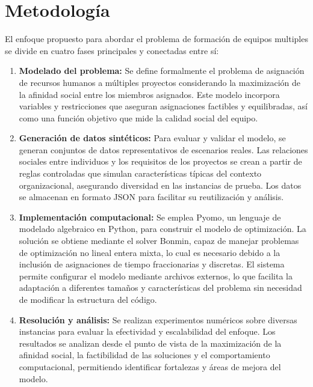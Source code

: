 \documentclass[conference]{IEEEtran}
\begin{document}
\section{Metodología}

El enfoque propuesto para abordar el problema de formación de equipos multiples se divide en cuatro fases principales y conectadas entre sí:

\begin{enumerate}
    \item \textbf{Modelado del problema:} Se define formalmente el problema de asignación de recursos humanos a múltiples proyectos considerando la maximización de la afinidad social entre los miembros asignados. Este modelo incorpora variables y restricciones que aseguran asignaciones factibles y equilibradas, así como una función objetivo que mide la calidad social del equipo.

    \item \textbf{Generación de datos sintéticos:} Para evaluar y validar el modelo, se generan conjuntos de datos representativos de escenarios reales. Las relaciones sociales entre individuos y los requisitos de los proyectos se crean a partir de reglas controladas que simulan características típicas del contexto organizacional, asegurando diversidad en las instancias de prueba. Los datos se almacenan en formato JSON para facilitar su reutilización y análisis.

    \item \textbf{Implementación computacional:} Se emplea Pyomo\cite{pyomo_hart2011}, un lenguaje de modelado algebraico en Python, para construir el modelo de optimización. La solución se obtiene mediante el solver Bonmin\cite{bonmin_bonami2008}, capaz de manejar problemas de optimización no lineal entera mixta, lo cual es necesario debido a la inclusión de asignaciones de tiempo fraccionarias y discretas. El sistema permite configurar el modelo mediante archivos externos, lo que facilita la adaptación a diferentes tamaños y características del problema sin necesidad de modificar la estructura del código.

    \item \textbf{Resolución y análisis:} Se realizan experimentos numéricos sobre diversas instancias para evaluar la efectividad y escalabilidad del enfoque. Los resultados se analizan desde el punto de vista de la maximización de la afinidad social, la factibilidad de las soluciones y el comportamiento computacional, permitiendo identificar fortalezas y áreas de mejora del modelo.
\end{enumerate}
\end{document}
